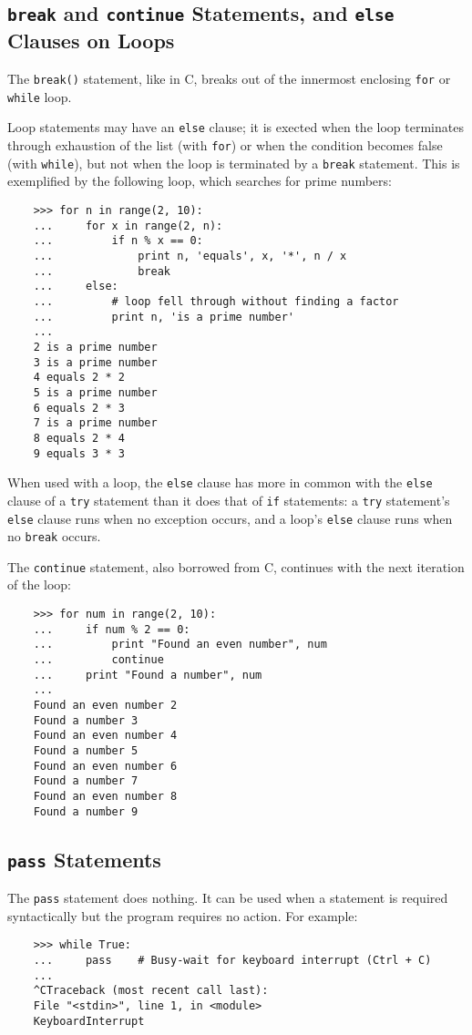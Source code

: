 \documentclass[UTF8]{article}
\begin{document}
\subsection{\texttt{break} and \texttt{continue} Statements, and \texttt{else} Clauses on Loops}
The \texttt{break()} statement, like in C, breaks out of the innermost enclosing \texttt{for} or
\texttt{while} loop.

Loop statements may have an \texttt{else} clause; it is exected when the loop terminates through
exhaustion of the list (with \texttt{for}) or when the condition becomes false (with
\texttt{while}), but not when the loop is terminated by a \texttt{break} statement. This is
exemplified by the following loop, which searches for prime numbers:
\begin{verbatim}
    >>> for n in range(2, 10):
    ...     for x in range(2, n):
    ...         if n % x == 0:
    ...             print n, 'equals', x, '*', n / x
    ...             break
    ...     else:
    ...         # loop fell through without finding a factor
    ...         print n, 'is a prime number'
    ...
    2 is a prime number
    3 is a prime number
    4 equals 2 * 2
    5 is a prime number
    6 equals 2 * 3
    7 is a prime number
    8 equals 2 * 4
    9 equals 3 * 3
\end{verbatim}

When used with a loop, the \texttt{else} clause has more in common with the \texttt{else} clause of
a \texttt{try} statement than it does that of \texttt{if} statements: a \texttt{try} statement's
\texttt{else} clause runs when no exception occurs, and a loop's \texttt{else} clause runs when no
\texttt{break} occurs.

The \texttt{continue} statement, also borrowed from C, continues with the next iteration of the
loop:
\begin{verbatim}
    >>> for num in range(2, 10):
    ...     if num % 2 == 0:
    ...         print "Found an even number", num
    ...         continue
    ...     print "Found a number", num
    ...
    Found an even number 2
    Found a number 3
    Found an even number 4
    Found a number 5
    Found an even number 6
    Found a number 7
    Found an even number 8
    Found a number 9
\end{verbatim}

\subsection{\texttt{pass} Statements}
The \texttt{pass} statement does nothing. It can be used when a statement is required syntactically
but the program requires no action. For example:
\begin{verbatim}
    >>> while True:
    ...     pass    # Busy-wait for keyboard interrupt (Ctrl + C)
    ...
    ^CTraceback (most recent call last):
    File "<stdin>", line 1, in <module>
    KeyboardInterrupt
\end{verbatim}
\end{document}
